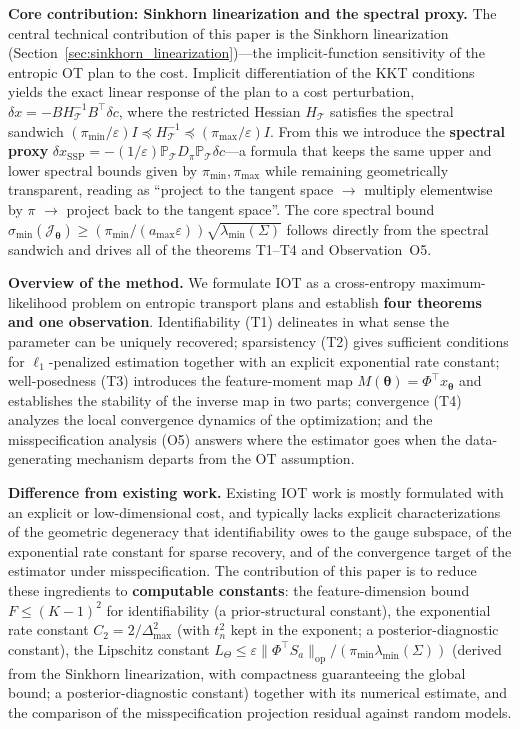 \documentclass[11pt,a4paper]{article}
\theoremstyle{remark}
\begin{document}
\textbf{Core contribution: Sinkhorn linearization and the spectral proxy.} The central
technical contribution of this paper is the Sinkhorn linearization
(Section~\ref{sec:sinkhorn_linearization})---the implicit-function sensitivity of the
entropic OT plan to the cost. Implicit differentiation of the KKT conditions yields the
exact linear response of the plan to a cost perturbation,
$\delta x=-B H_{\mathcal{T}}^{-1}B^{\top}\delta c$, where the restricted Hessian
$H_{\mathcal{T}}$ satisfies the spectral sandwich
$(\pi_{\min}/\varepsilon)I\preceq H_{\mathcal{T}}^{-1}\preceq(\pi_{\max}/\varepsilon)I$.
From this we introduce the \textbf{spectral proxy}
$\delta x_{\mathrm{SSP}}=-(1/\varepsilon)\mathbb{P}_{\mathcal{T}}D_\pi\mathbb{P}_{\mathcal{T}}\delta c$---a
formula that keeps the same upper and lower spectral bounds given by $\pi_{\min},\pi_{\max}$
while remaining geometrically transparent, reading as ``project to the tangent space
$\to$ multiply elementwise by $\pi$ $\to$ project back to the tangent space''. The core
spectral bound
$\sigma_{\min}(\mathcal{J}_{\bm{\theta}})\ge(\pi_{\min}/(a_{\max}\varepsilon))\sqrt{\lambda_{\min}(\Sigma)}$
follows directly from the spectral sandwich and drives all of the theorems T1--T4 and
Observation~O5.

\textbf{Overview of the method.} We formulate IOT as a cross-entropy maximum-likelihood
problem on entropic transport plans and establish \textbf{four theorems and one
observation}. Identifiability (T1) delineates in what sense the parameter can be uniquely
recovered; sparsistency (T2) gives sufficient conditions for $\ell_1$-penalized estimation
together with an explicit exponential rate constant; well-posedness (T3) introduces the
feature-moment map $M(\bm{\theta})=\Phi^{\top}x_{\bm{\theta}}$ and establishes the
stability of the inverse map in two parts; convergence (T4) analyzes the local convergence
dynamics of the optimization; and the misspecification analysis (O5) answers where the
estimator goes when the data-generating mechanism departs from the OT assumption.

\textbf{Difference from existing work.} Existing IOT work is mostly formulated with an
explicit or low-dimensional cost, and typically lacks explicit characterizations of the
geometric degeneracy that identifiability owes to the gauge subspace, of the exponential
rate constant for sparse recovery, and of the convergence target of the estimator under
misspecification. The contribution of this paper is to reduce these ingredients to
\textbf{computable constants}: the feature-dimension bound $F\le(K-1)^2$ for
identifiability (a prior-structural constant), the exponential rate constant
$C_2=2/\Delta_{\max}^2$ (with $t_n^2$ kept in the exponent; a posterior-diagnostic
constant), the Lipschitz constant
$L_\Theta\le\varepsilon\|\Phi^{\top}S_a\|_{\mathrm{op}}/(\pi_{\min}\lambda_{\min}(\Sigma))$
(derived from the Sinkhorn linearization, with compactness guaranteeing the global bound; a
posterior-diagnostic constant) together with its numerical estimate, and the comparison of
the misspecification projection residual against random models.
\end{document}

